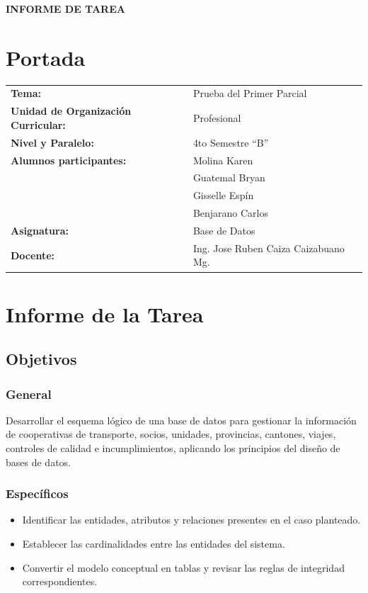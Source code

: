 \documentclass{article}
\begin{document}
\begin{center}
    {\large \textbf{INFORME DE TAREA}} \\
\end{center}

\section{Portada}
\begin{flushleft}
\begin{tabular}{ l l }
    \textbf{Tema:} & Prueba del Primer Parcial \\
    \textbf{Unidad de Organización Curricular:} & Profesional \\
    \textbf{Nivel y Paralelo:} & 4to Semestre ``B'' \\
    \textbf{Alumnos participantes:} & Molina Karen \\
    & Guatemal Bryan \\
    & Gisselle Espín \\
    & Benjarano Carlos \\
    \textbf{Asignatura:} & Base de Datos \\
    \textbf{Docente:} & Ing. Jose Ruben Caiza Caizabuano Mg. \\
\end{tabular}
\end{flushleft}

\section{Informe de la Tarea}

\subsection{Objetivos}

\subsubsection{General}
Desarrollar el esquema lógico de una base de datos para gestionar la información de cooperativas de transporte, socios, unidades, provincias, cantones, viajes, controles de calidad e incumplimientos, aplicando los principios del diseño de bases de datos.

\subsubsection{Específicos}
\begin{itemize}
    \item Identificar las entidades, atributos y relaciones presentes en el caso planteado.
    \item Establecer las cardinalidades entre las entidades del sistema.
    \item Convertir el modelo conceptual en tablas y revisar las reglas de integridad correspondientes.
\end{itemize}
\end{document}
